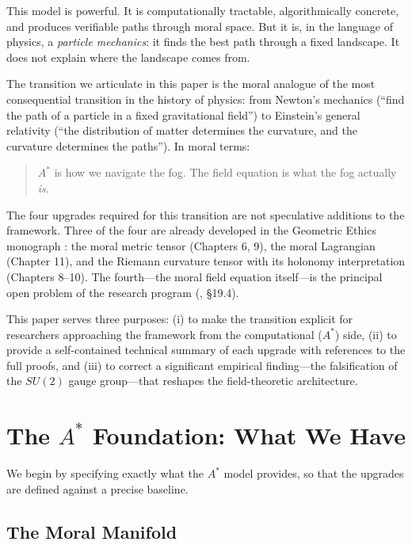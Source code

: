 \documentclass[12pt,letterpaper]{article}
\theoremstyle{definition}
\begin{document}
This model is powerful. It is computationally tractable, algorithmically concrete, and produces verifiable paths through moral space. But it is, in the language of physics, a \emph{particle mechanics}: it finds the best path through a fixed landscape. It does not explain where the landscape comes from.

The transition we articulate in this paper is the moral analogue of the most consequential transition in the history of physics: from Newton's mechanics (``find the path of a particle in a fixed gravitational field'') to Einstein's general relativity (``the distribution of matter determines the curvature, and the curvature determines the paths''). In moral terms:

\begin{quote}
$A^*$ is how we navigate the fog. The field equation is what the fog actually \emph{is}.
\end{quote}

The four upgrades required for this transition are not speculative additions to the framework. Three of the four are already developed in the Geometric Ethics monograph \cite{bond2026ge}: the moral metric tensor (Chapters 6, 9), the moral Lagrangian (Chapter 11), and the Riemann curvature tensor with its holonomy interpretation (Chapters 8--10). The fourth---the moral field equation itself---is the principal open problem of the research program (\cite{bond2026ge}, \S19.4).

This paper serves three purposes: (i) to make the transition explicit for researchers approaching the framework from the computational ($A^*$) side, (ii) to provide a self-contained technical summary of each upgrade with references to the full proofs, and (iii) to correct a significant empirical finding---the falsification of the $SU(2)$ gauge group---that reshapes the field-theoretic architecture.


\section{The $A^*$ Foundation: What We Have}
\label{sec:astar}

We begin by specifying exactly what the $A^*$ model provides, so that the upgrades are defined against a precise baseline.

\subsection{The Moral Manifold}
\end{document}
